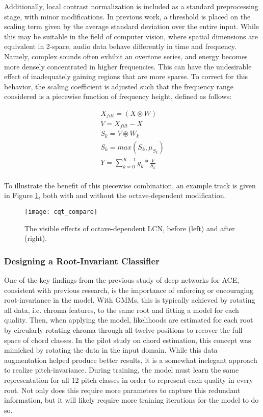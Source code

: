 Additionally, local contrast normalization is included as a standard preprocessing stage, with minor modifications.
In previous work, a threshold is placed on the scaling term given by the average standard deviation over the entire input.
While this may be suitable in the field of computer vision, where spatial dimensions are equivalent in 2-space, audio data behave differently in time and frequency.
Namely, complex sounds often exhibit an overtone series, and energy becomes more densely concentrated in higher frequencies.
This can have the undesirable effect of inadequately gaining regions that are more sparse.
To correct for this behavior, the scaling coefficient is adjusted such that the frequency range considered is a piecewise function of frequency height, defined as follows:


\begin{align*}
X_{filt} = (X \circledast W) \\
V = X_{filt} - X \\
S_k = V \circledast W_k \\
S_k = max(S_k, \mu_{S_k}) \\
Y = \sum_{k=0}^{K-1} g_k * \frac{V}{S_k} \\
\end{align*}

\noindent To illustrate the benefit of this piecewise combination, an example track is given in Figure \ref{fig:lcn_mods}, both with and without the octave-dependent modification.

\begin{figure}[!t]
\centering
\texttt{[image: cqt\_compare]}
\caption{The visible effects of octave-dependent LCN, before (left) and after (right).}
\label{fig:lcn_mods}
\end{figure}


\subsubsection{Designing a Root-Invariant Classifier}
\label{subsubsec:root_invariance}
One of the key findings from the previous study of deep networks for ACE, consistent with previous research, is the importance of enforcing or encouraging root-invariance in the model.
With GMMs, this is typically achieved by rotating all data, i.e. chroma features, to the same root and fitting a model for each quality.
Then, when applying the model, likelihoods are estimated for each root by circularly rotating chroma through all twelve positions to recover the full space of chord classes.
In the pilot study on chord estimation, this concept was mimicked by rotating the data in the input domain.
While this data augmentation helped produce better results, it is a somewhat inelegant approach to realize pitch-invariance.
During training, the model must learn the same representation for all 12 pitch classes in order to represent each quality in every root.
Not only does this require more parameters to capture this redundant information, but it will likely require more training iterations for the model to do so.

